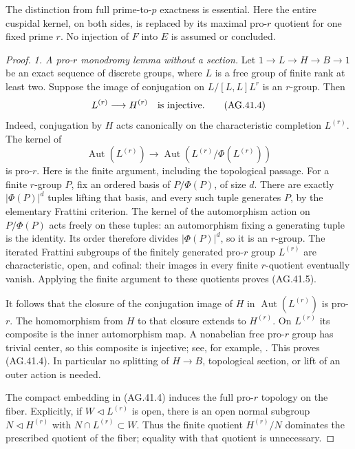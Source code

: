 The distinction from full prime-to-\(p\) exactness is essential.
Here the entire cuspidal kernel, on both sides, is replaced by
its maximal pro-\(r\) quotient for one fixed prime \(r\).
No injection of \(F\) into \(E\) is assumed or concluded.

\begin{proof}
\emph{1. A pro-\(r\) monodromy lemma without a section.}
Let \(1\to L\to H\to B\to1\) be an exact sequence of
discrete groups, where \(L\) is a free group of finite rank
at least two. Suppose the image of conjugation on
\(L/[L,L]L^r\) is an \(r\)-group. Then
\[
                         L^{(r)}\longrightarrow H^{(r)}
                    \quad\hbox{is injective}.             \tag{AG.41.4}
\]
Indeed, conjugation by \(H\) acts canonically on the
characteristic completion \(L^{(r)}\). The kernel of
\[
 \operatorname{Aut}(L^{(r)})\longrightarrow
 \operatorname{Aut}(L^{(r)}/\Phi(L^{(r)}))
                                                        \tag{AG.41.5}
\]
is pro-\(r\). Here is the finite argument, including the
topological passage. For a finite \(r\)-group \(P\), fix
an ordered basis of \(P/\Phi(P)\), of size \(d\).
There are exactly \(|\Phi(P)|^d\) tuples lifting that basis,
and every such tuple generates \(P\), by the elementary
Frattini criterion. The kernel of the automorphism action
on \(P/\Phi(P)\) acts freely on these tuples: an
automorphism fixing a generating tuple is the identity.
Its order therefore divides \(|\Phi(P)|^d\), so it is an
\(r\)-group. The iterated Frattini subgroups of the
finitely generated pro-\(r\) group \(L^{(r)}\) are
characteristic, open, and cofinal: their images in every
finite \(r\)-quotient eventually vanish. Applying the
finite argument to these quotients proves (AG.41.5).

It follows that the closure of the conjugation image of
\(H\) in \(\operatorname{Aut}(L^{(r)})\) is pro-\(r\).
The homomorphism from \(H\) to that closure extends to
\(H^{(r)}\). On \(L^{(r)}\) its composite is the inner
automorphism map. A nonabelian free pro-\(r\) group has
trivial center, so this composite is injective; see, for
example, \cite[Theorem~5.1, proof Case~I, and
Corollary~5.3]{FF_KochloukovaZalesskii2011}.
This proves (AG.41.4). In particular no splitting of
\(H\to B\), topological section, or lift of an outer
action is needed.

The compact embedding in (AG.41.4) induces the full
pro-\(r\) topology on the fiber. Explicitly, if
\(W\triangleleft L^{(r)}\) is open, there is an open
normal subgroup \(N\triangleleft H^{(r)}\) with
\(N\cap L^{(r)}\subset W\). Thus the finite quotient
\(H^{(r)}/N\) dominates the prescribed quotient of the
fiber; equality with that quotient is unnecessary.


\end{proof}
